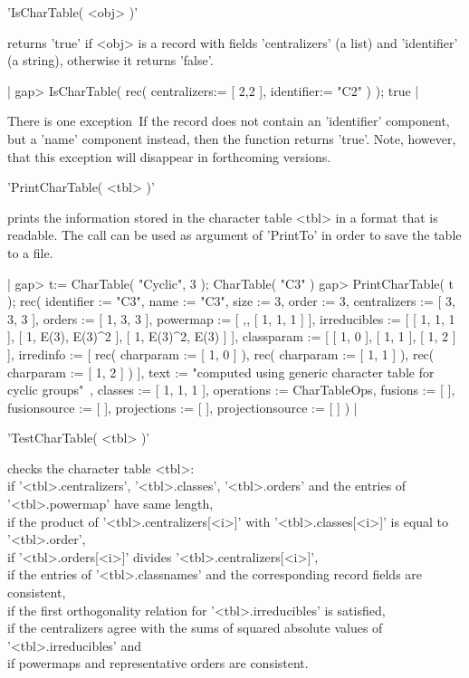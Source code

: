
'IsCharTable( <obj> )'

returns 'true' if <obj> is a record with fields 'centralizers' (a list)
and 'identifier' (a string), otherwise it returns 'false'.

|    gap> IsCharTable( rec( centralizers:= [ 2,2 ], identifier:= "C2" ) );
    true |

There is one exception\:\ If the record does not contain an 'identifier'
component, but a 'name' component instead, then the function returns
'true'. Note, however, that this exception will disappear in forthcoming
{\GAP} versions.


'PrintCharTable( <tbl> )'

prints the information stored in the character table <tbl> in a format
that is {\GAP} readable.  The call can be used as argument of 'PrintTo'
in order to save the table to a file.

|    gap> t:= CharTable( "Cyclic", 3 );
    CharTable( "C3" )
    gap> PrintCharTable( t );
    rec( identifier := "C3", name := "C3", size := 3, order :=
    3, centralizers := [ 3, 3, 3 ], orders := [ 1, 3, 3 ], powermap :=
    [ ,, [ 1, 1, 1 ] ], irreducibles :=
    [ [ 1, 1, 1 ], [ 1, E(3), E(3)^2 ], [ 1, E(3)^2, E(3) ]
     ], classparam := [ [ 1, 0 ], [ 1, 1 ], [ 1, 2 ] ], irredinfo :=
    [ rec(
          charparam := [ 1, 0 ] ), rec(
          charparam := [ 1, 1 ] ), rec(
          charparam := [ 1, 2 ] )
     ], text := "computed using generic character table for cyclic groups"\
    , classes := [ 1, 1, 1 ], operations := CharTableOps, fusions :=
    [  ], fusionsource := [  ], projections := [  ], projectionsource :=
    [  ] ) |

\Section{TestCharTable}

'TestCharTable( <tbl> )'

checks the character table <tbl>:\\
 if '<tbl>.centralizers', '<tbl>.classes', '<tbl>.orders' and the entries
 of '<tbl>.powermap' have same length,\\
 if the product of '<tbl>.centralizers[<i>]' with '<tbl>.classes[<i>]' is
 equal to '<tbl>.order',\\
 if '<tbl>.orders[<i>]' divides '<tbl>.centralizers[<i>]',\\
 if the entries of '<tbl>.classnames' and the corresponding record fields
 are consistent,\\
 if the first orthogonality relation for '<tbl>.irreducibles' is
 satisfied,\\
 if the centralizers agree with the sums of squared
 absolute values of '<tbl>.irreducibles' and\\
 if powermaps and representative orders are consistent.

